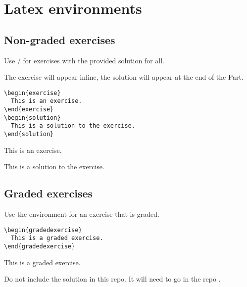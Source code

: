 

\section{Latex environments}

\subsection{Non-graded exercises}

Use / for exercises with the provided solution for all.

The exercise will appear inline, the solution will appear at the end of the Part.

\begin{verbatim}
\begin{exercise}
  This is an exercise.
\end{exercise}
\begin{solution}
  This is a solution to the exercise.
\end{solution}
\end{verbatim}

\begin{exercise}
  This is an exercise.
\end{exercise}
\begin{solution}
  This is a solution to the exercise.
\end{solution}

\subsection{Graded exercises}

Use the environment  for an exercise that is graded.

\begin{verbatim}
\begin{gradedexercise}
  This is a graded exercise.
\end{gradedexercise}
\end{verbatim}


\begin{gradedexercise}
  This is a graded exercise.
\end{gradedexercise}


Do not include the solution in this repo. It will need to go in the repo
.

